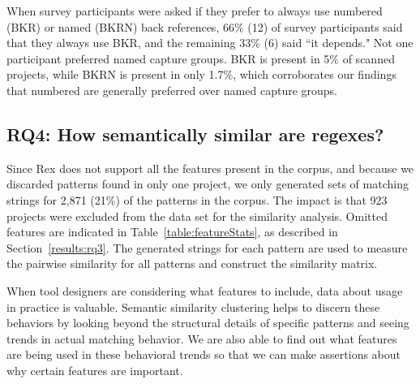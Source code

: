 When survey participants were asked if they prefer to always use numbered (BKR) or named (BKRN) back references, 66\% (12) of survey participants said that they always use BKR, and the remaining 33\% (6) said ``it depends."  Not one participant preferred named capture groups.  BKR is present in 5\% of scanned projects, while BKRN is present in only 1.7\%, which corroborates our findings that numbered  are generally preferred over named capture groups.

\subsection{RQ4: How semantically similar are regexes?}
\label{rq4:results}

 Since Rex does not support all the features present in the corpus, and because we discarded patterns found in only one project, we only generated sets of matching strings for 2,871 (21\%) of the  patterns in the corpus. The impact is that 923 projects were excluded from the data set for the similarity analysis. Omitted features are indicated in Table~\ref{table:featureStats}, as described in Section~\ref{results:rq3}.
The generated strings for each pattern are used to measure the pairwise similarity for all patterns and construct the similarity matrix.


When tool designers are considering what features to include, data about usage in practice is valuable.  Semantic similarity clustering  helps to discern these behaviors by looking beyond the structural details of specific patterns and seeing trends in actual matching behavior.  We are also able to find out what features are being used in these behavioral trends so that we can make assertions about why certain features are important.

